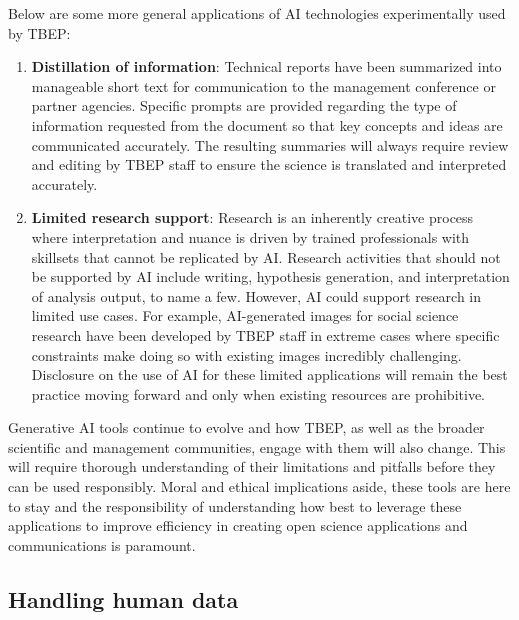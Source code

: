 \documentclass[
]{book}
\providecommand{\tightlist}{%
  \setlength{\itemsep}{0pt}\setlength{\parskip}{0pt}}
\begin{document}
Below are some more general applications of AI technologies experimentally used by TBEP:

\begin{enumerate}
\def\labelenumi{\arabic{enumi}.}
\tightlist
\item
  \textbf{Distillation of information}: Technical reports have been summarized into manageable short text for communication to the management conference or partner agencies. Specific prompts are provided regarding the type of information requested from the document so that key concepts and ideas are communicated accurately. The resulting summaries will always require review and editing by TBEP staff to ensure the science is translated and interpreted accurately.
\item
  \textbf{Limited research support}: Research is an inherently creative process where interpretation and nuance is driven by trained professionals with skillsets that cannot be replicated by AI. Research activities that should not be supported by AI include writing, hypothesis generation, and interpretation of analysis output, to name a few. However, AI could support research in limited use cases. For example, AI-generated images for social science research have been developed by TBEP staff in extreme cases where specific constraints make doing so with existing images incredibly challenging. Disclosure on the use of AI for these limited applications will remain the best practice moving forward and only when existing resources are prohibitive.
\end{enumerate}

Generative AI tools continue to evolve and how TBEP, as well as the broader scientific and management communities, engage with them will also change. This will require thorough understanding of their limitations and pitfalls before they can be used responsibly. Moral and ethical implications aside, these tools are here to stay and the responsibility of understanding how best to leverage these applications to improve efficiency in creating open science applications and communications is paramount.

\subsection{Handling human data}\label{humandata}
\end{document}
